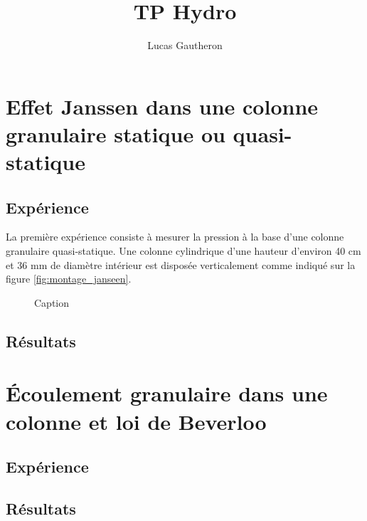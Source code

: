 \documentclass[french]{article}
\title{TP Hydro}
\author{Lucas Gautheron}
\date{}
\begin{document}
\maketitle

\section{Effet Janssen dans une colonne granulaire statique ou quasi-statique}

\subsection{Expérience}

La première expérience consiste à mesurer la pression à la base d'une colonne granulaire quasi-statique. Une colonne cylindrique d'une hauteur d'environ 40 cm et 36 mm de diamètre intérieur est disposée verticalement comme indiqué sur la figure \ref{fig:montage_janseen}. 

\begin{figure}
    \centering
    
    \caption{Caption}
    \label{fig:my_label}
\end{figure}


\subsection{Résultats}

\section{Écoulement granulaire dans une colonne et loi de Beverloo}

\subsection{Expérience}
\subsection{Résultats}
\end{document}
